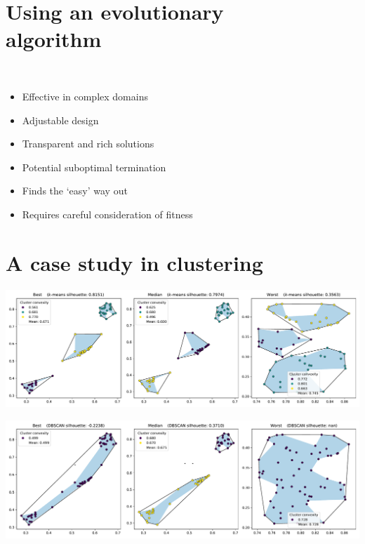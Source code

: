 \documentclass{betterposter}
\begin{document}
{\section{Using an evolutionary\\algorithm}

\begin{minipage}{.05\linewidth}
    \
\end{minipage}
\begin{minipage}{.9\linewidth}
\begin{itemize}
    \renewcommand\labelitemi{\faThumbsOUp~}
    \item Effective in complex domains
    \item Adjustable design
    \item Transparent and rich solutions
\end{itemize}

\vspace{1ex}\begin{itemize}
    \renewcommand\labelitemi{\faThumbsODown~}
    \item Potential suboptimal termination
    \item Finds the `easy' way out
    \item Requires careful consideration of fitness
\end{itemize}
\end{minipage}


\section{A case study in clustering}

\includegraphics[width=\linewidth]{img/kmeans.pdf}\vspace{1em}

\includegraphics[width=\linewidth]{img/dbscan.pdf}

}
\end{document}
